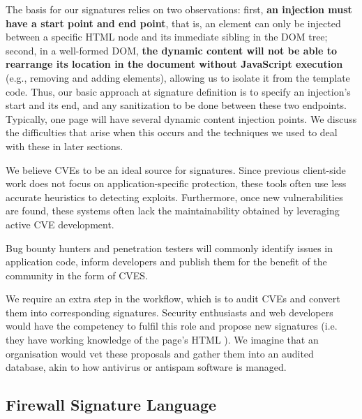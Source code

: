 The basis for our signatures relies on two observations: first,
\textbf{an injection must have a start point and end point}, that is,
an element can only be injected between a specific HTML node and its
immediate sibling in the DOM tree; second, in a well-formed DOM,
\textbf{the dynamic content will not be able to rearrange its location
  in the document without JavaScript execution} (e.g., removing and
adding elements), allowing us to isolate it from the template
code. Thus, our basic approach at signature definition is to specify
an injection's start and its end, and any sanitization to be done
between these two endpoints. Typically, one page will have several
dynamic content injection points. We discuss the difficulties that
arise when this occurs and the techniques we used to deal with these
in later sections.

We believe CVEs to be an ideal source for signatures. Since previous
client-side work does not focus on application-specific protection,
these tools often use less accurate heuristics to detecting
exploits. Furthermore, once new vulnerabilities are found, these
systems often lack the maintainability obtained by leveraging active
CVE development.

Bug bounty hunters and penetration testers will commonly identify
issues in application code, inform developers and publish them for the
benefit of the community in the form of CVES.

We require an extra step in the workflow, which is to audit CVEs and
convert them into corresponding signatures. Security enthusiasts and
web developers would have the competency to fulfil this role and
propose new signatures (i.e. they have working knowledge of the page's
HTML ). We imagine that an organisation would vet these proposals and
gather them into an audited database, akin to how antivirus or
antispam software is managed.


 \subsection{Firewall Signature Language} \label{signature_language}

